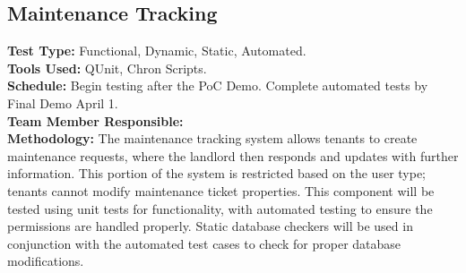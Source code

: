 \documentclass[12pt]{article}
\begin{document}
\subsection{Maintenance Tracking}
\textbf{Test Type:} Functional, Dynamic, Static, Automated. \\
\textbf{Tools Used:} QUnit, Chron Scripts. \\
\textbf{Schedule:} Begin testing after the PoC Demo. Complete automated tests by Final Demo April 1. \\
\textbf{Team Member Responsible:} \\
\textbf{Methodology:} The maintenance tracking system allows tenants to create maintenance requests, where the landlord then responds and updates with further information. This portion of the system is restricted based on the user type; tenants cannot modify maintenance ticket properties. This component will be tested using unit tests for functionality, with automated testing to ensure the permissions are handled properly. Static database checkers will be used in conjunction with the automated test cases to check for proper database modifications.
\end{document}

